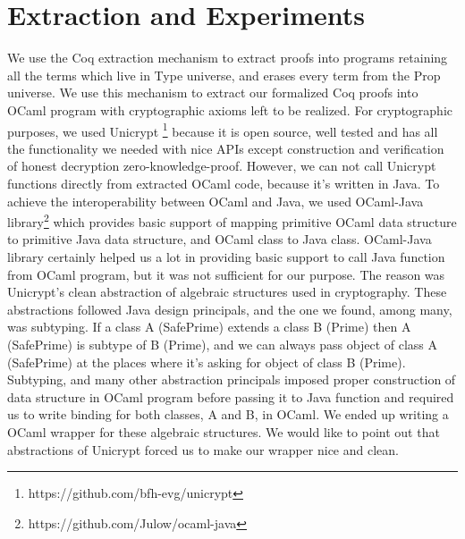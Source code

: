 \documentclass{llncs}
\begin{document}
\section{Extraction and Experiments}

We use the Coq extraction mechanism\cite{Letouzey:2003:NEC}  to extract
proofs into programs retaining all the terms which live in Type universe, 
and erases every term  from the Prop universe. We use this mechanism to 
extract our formalized Coq proofs into OCaml\cite{Leroy:2013:ORM} program 
with cryptographic axioms left to be realized. For cryptographic purposes, 
we used Unicrypt 
\footnote{https://github.com/bfh-evg/unicrypt}
because it is open source, well tested and has all the functionality 
we needed with nice APIs except construction and verification of 
honest decryption zero-knowledge-proof.
However, we can not call Unicrypt functions directly from extracted OCaml 
code, because it's written in Java. To achieve the interoperability 
between OCaml and Java, we used OCaml-Java library\footnote{ 
https://github.com/Julow/ocaml-java} which provides
 basic support of mapping  primitive OCaml data structure to
 primitive Java  data structure, and OCaml class to Java class. 
 OCaml-Java library certainly helped us a lot in providing basic 
 support to call Java function from OCaml program, but it was not 
 sufficient for
 our purpose. The reason was Unicrypt's clean abstraction of 
 algebraic structures used in cryptography. These abstractions followed 
 Java design principals, and the one we found, among many, was subtyping.
 If a class A (SafePrime) extends a class B (Prime) then 
 A (SafePrime) is subtype of B (Prime), 
 and we can always pass object of class A (SafePrime) at 
 the places where it's asking for object of class B (Prime). 
 Subtyping, and many other abstraction principals imposed 
 proper construction of data structure in OCaml program 
 before passing it to Java function and  
 required us to
 write binding for both classes, A and B, in OCaml. We ended up writing a
 OCaml wrapper for these algebraic structures. We would like to point out
 that abstractions of Unicrypt forced us to make our wrapper 
 nice and clean.
 
\end{document}
